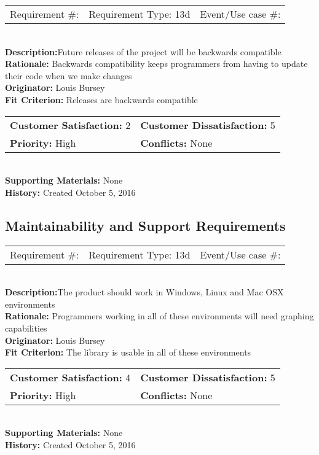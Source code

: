 \documentclass[12pt, titlepage]{article}
\begin{document}
%
%
\begin{reqbox}
\begin{tabular}{ccc}
Requirement \#: & Requirement Type: 13d & Event/Use case \#: \\
\end{tabular} \\
\textbf{Description:}Future releases of the project will be backwards compatible \\
\textbf{Rationale:} Backwards compatibility keeps programmers from having to update their code when we make changes\\
\textbf{Originator:} Louis Bursey\\
\textbf{Fit Criterion:}  Releases are backwards compatible\\
\begin{tabular}{ll}
\textbf{Customer Satisfaction:} 2 & \textbf{Customer Dissatisfaction:} 5 \\
\textbf{Priority:} High & \textbf{Conflicts:} None\\
\end{tabular} \\
\textbf{Supporting Materials:} None \\
\textbf{History:} Created October 5, 2016
\end{reqbox}

\subsection{Maintainability and Support Requirements}
%
%
%
%
%
\begin{reqbox}
\begin{tabular}{ccc}
Requirement \#: & Requirement Type: 13d & Event/Use case \#: \\
\end{tabular} \\
\textbf{Description:}The product should work in Windows, Linux and Mac OSX environments \\
\textbf{Rationale:} Programmers working in all of these environments will need graphing capabilities\\
\textbf{Originator:} Louis Bursey\\
\textbf{Fit Criterion:}  The library is usable in all of these environments \\
\begin{tabular}{ll}
\textbf{Customer Satisfaction:} 4 & \textbf{Customer Dissatisfaction:} 5 \\
\textbf{Priority:} High & \textbf{Conflicts:} None\\
\end{tabular} \\
\textbf{Supporting Materials:} None \\
\textbf{History:} Created October 5, 2016
\end{reqbox}
\end{document}
